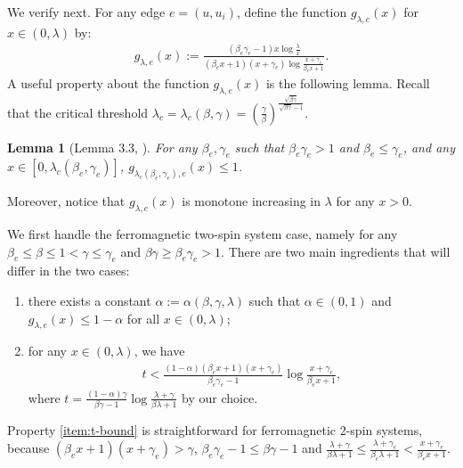 \documentclass[11pt]{amsart}
\newcommand{\defeq}{:=}
\newtheorem{lemma}[theorem]{Lemma}
\theoremstyle{definition}
\theoremstyle{remark}
\begin{document}
We verify  next.
For any edge $e=(u,u_i)$, define the function $g_{\lambda,e}(x)$ for $x \in (0,\lambda)$ by:
\begin{align*}
g_{\lambda,e}(x):=\frac{(\beta_e\gamma_e-1)x\log\frac{\lambda}{x}}{(\beta_ex+1)(x+\gamma_e)\log\frac{x+\gamma_e}{\beta_e x+1}}.
\end{align*}
A useful property about the function $g_{\lambda,e}(x)$ is the following lemma.
Recall that the critical threshold $\lambda_c=\lambda_c(\beta,\gamma)=\left(\frac{\gamma}{\beta}\right)^{\frac{\sqrt{\beta\gamma}}{\sqrt{\beta\gamma}-1}}$.
\begin{lemma}[Lemma 3.3, ]\label{lemma:guo-lemma-3.3}
  For any $\beta_e,\gamma_e$ such that $\beta_e\gamma_e>1$ and $\beta_e\le \gamma_e$,
  and any $x\in[0,\lambda_c(\beta_e,\gamma_e)]$, $g_{\lambda_c(\beta_e,\gamma_e),e}(x)\leq 1$.
\end{lemma}
Moreover, notice that $g_{\lambda,e}(x)$ is monotone increasing in $\lambda$ for any $x>0$.

We first handle the ferromagnetic two-spin system case, namely for any $\beta_e\leq \beta\leq 1<\gamma\leq \gamma_e$ and $\beta\gamma\geq \beta_e\gamma_e>1$. 
There are two main ingredients that will differ in the two cases:
\begin{enumerate}
  \item\label{item:g-bound} there exists a constant $\alpha\defeq\alpha(\beta,\gamma,\lambda)$ such that $\alpha\in(0,1)$ and $g_{\lambda,e}(x) \leq 1-\alpha$ for all $x \in (0,\lambda)$;
  \item\label{item:t-bound} for any $x \in (0,\lambda)$, we have
    \begin{align}\label{eq:t-bound}
      t<\frac{(1-\alpha)(\beta_e x+1)(x+\gamma_e)}{\beta_e\gamma_e-1}\log\frac{x+\gamma_e}{\beta_e x+1},
    \end{align}
    where $t=\frac{(1-\alpha)\gamma}{\beta\gamma-1}\log\frac{\lambda+\gamma}{\beta \lambda+1}$ by our choice.
\end{enumerate}

Property \eqref{item:t-bound} is straightforward for ferromagnetic 2-spin systems,
because $(\beta_e x+1)(x+\gamma_e)>\gamma$, $\beta_e\gamma_e-1\leq \beta\gamma-1$ and $\frac{\lambda+\gamma}{\beta \lambda+1}\leq \frac{\lambda+\gamma_e}{\beta_e \lambda+1}<\frac{x+\gamma_e}{\beta_e x+1}$.
\end{document}
